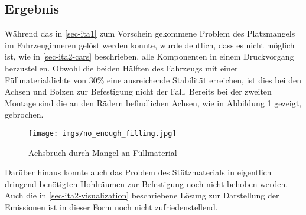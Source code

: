 \documentclass[.../Dokumentation.tex]{subfiles}
\begin{document}
\subsection{Ergebnis}\label{sec-ita2-result}
Während das in \ref{sec-ita1} zum Vorschein gekommene Problem des 
Platzmangels im Fahrzeuginneren gelöst werden konnte, wurde deutlich, 
dass es nicht möglich ist, wie in \ref{sec-ita2-cars} beschrieben, 
alle Komponenten in einem Druckvorgang herzustellen. 
Obwohl die beiden Hälften des Fahrzeugs mit einer Füllmaterialdichte von 
30\% eine ausreichende Stabilität erreichen, ist dies bei den Achsen und 
Bolzen zur Befestigung nicht der Fall. Bereits bei der zweiten Montage sind 
die an den Rädern befindlichen Achsen, wie in Abbildung 
\ref{fig-not-enough-filling} gezeigt, gebrochen. 
\begin{figure}[H]
\begin{center}
    \texttt{[image: imgs/no\_enough\_filling.jpg]}
    \caption{Achsbruch durch Mangel an Füllmaterial}
    \label{fig-not-enough-filling}
\end{center}
\end{figure}
\noindent
Darüber hinaus konnte auch das Problem des Stützmaterials in eigentlich 
dringend benötigten Hohlräumen zur Befestigung noch nicht behoben werden.
Auch die in \ref{sec-ita2-visualization} beschriebene Lösung zur 
Darstellung der Emissionen ist in dieser Form noch nicht zufriedenstellend.
\end{document}
